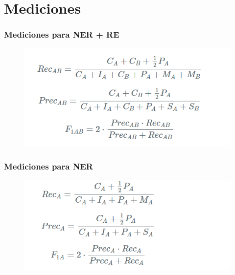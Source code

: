 \documentclass[
11pt, %
%
aspectratio=169, %
]{beamer}
\begin{document}
	\section{Mediciones}
	\begin{frame}
		\frametitle{Mediciones para NER + RE}
		
				\begin{figure}[h!]
					\centering
					\includegraphics[scale=0.5]{../images/escenario_1}
				\end{figure} 	
		
	\end{frame}

	\begin{frame}
		\frametitle{Mediciones para NER}
		
		\begin{figure}[h!]
			\centering
			\includegraphics[scale=0.5]{../images/escenario_2}
		\end{figure} 	
		
	\end{frame}
\end{document}
